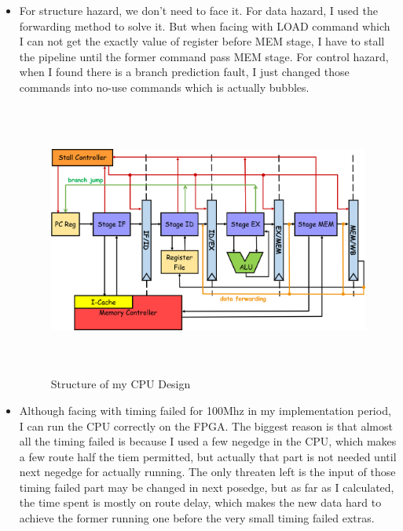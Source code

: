 \documentclass[12pt, a4paper]{article}
\theoremstyle{margin}
\begin{document}
\begin{itemize}
\item For structure hazard, we don't need to face it. For data hazard, I used the forwarding method to solve it. But when facing with LOAD command which I can not get the exactly value of register before MEM stage, I have to stall the pipeline until the former command pass MEM stage. For control hazard, when I found there is a branch prediction fault, I just changed those commands into no-use commands which is actually bubbles.

\begin{figure}[H]
	\begin{center}
	  \includegraphics[height=9cm]{structure.png}
	\end{center}
	\caption{Structure of my CPU Design}
\end{figure}





    \item Although facing with timing failed for 100Mhz in my implementation period, I can run the CPU correctly on the FPGA. The biggest reason is that almost all the timing failed is because I used a few negedge in the CPU, which makes a few route half the tiem permitted, but actually that part is not needed until next negedge for actually running. The only threaten left is the input of those timing failed part may be changed in next posedge, but as far as I calculated, the time spent is mostly on route delay, which makes the new data hard to achieve the former running one before the very small timing failed extras.
\end{itemize}
\end{document}
